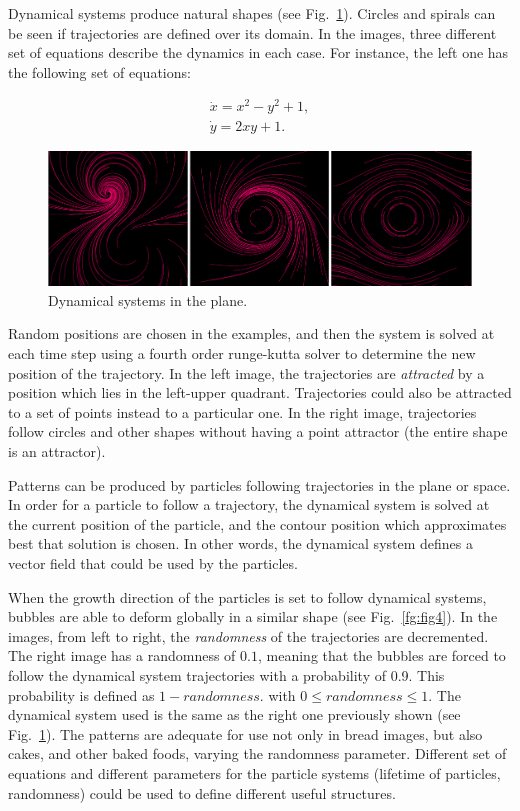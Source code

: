 \documentclass[oneside,a4paper,english,links]{amca}
\begin{document}
Dynamical systems produce natural shapes (see Fig.~\ref{fg:fig3}). Circles and spirals can be seen if trajectories are defined over its domain. In the images, three different set of equations describe the dynamics in each case. For instance, the left one has the following set of equations:

\begin{equation} \label{eq:simple}  
  \begin{aligned}
    \dot{x} = x^{2}-y^{2}+1,\\
    \dot{y} = 2xy+1.
  \end{aligned}
\end{equation}


\begin{figure}[htb!]
  \centerline{\includegraphics[scale=0.28]{fig3}}
  \caption{Dynamical systems in the plane.}
  \label{fg:fig3}
\end{figure}


Random positions are chosen in the examples, and then the system is solved at each time step using a fourth order runge-kutta solver to determine the new position of the trajectory. In the left image, the trajectories are {\em attracted} by a position which lies in the left-upper quadrant. Trajectories could also be attracted to a set of points instead to a particular one. In the right image, trajectories follow circles and other shapes without having a point attractor (the entire shape is an attractor).

Patterns can be produced by particles following trajectories in the plane or space. In order for a particle to follow a trajectory, the dynamical system is solved at the current position of the particle, and the contour position which approximates best that solution is chosen. In other words, the dynamical system defines a vector field that could be used by the particles.

When the growth direction of the particles is set to follow dynamical systems, bubbles are able to deform globally in a similar shape (see Fig.~\ref{fg:fig4}). In the images, from left to right, the {\em randomness} of the trajectories are decremented. The right image has a randomness of $0.1$, meaning that the bubbles are forced to follow the dynamical system trajectories with a probability of 0.9. This probability is defined as $1-randomness$. with $0 \leq randomness \leq 1$. The dynamical system used is the same as the right one previously shown (see Fig.~\ref{fg:fig3}).
The patterns are adequate for use not only in bread images, but also cakes, and other baked foods, varying the randomness parameter. Different set of equations and different parameters for the particle systems (lifetime of particles, randomness) could be used to define different useful structures.
\end{document}
